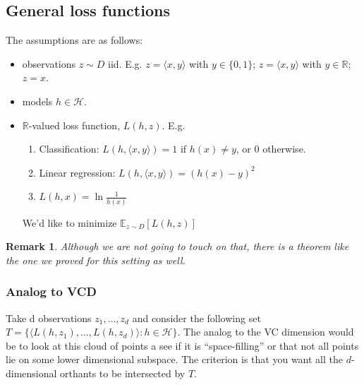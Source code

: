\documentclass[12pt, letterpaper]{article}
\numberwithin{equation}{section} %
\newcommand{\R}{\mathbb{R}}
\newcommand{\mb}{\mathbb}
\newcommand{\mc}{\mathcal}
\newtheorem{remark}[theorem]{Remark}
\theoremstyle{definition}
\theoremstyle{remark}
\begin{document}
\subsection{General loss functions}
The assumptions are as follows:
\begin{itemize}
\item observations $z \sim D$ iid. E.g. $z = \langle x, y\rangle$ with $y\in\lbrace 0,1\rbrace$;  $z = \langle x, y\rangle$ with $y\in\R$; $z=x$.
\item models $h\in\mc H$.
\item $\R$-valued loss function, $L(h,z)$. E.g.
    \begin{enumerate}
    \item Classification: $L(h, \langle x,y \rangle) = 1$ if $h(x)\ne y$, or 0 otherwise.
    \item Linear regression: $L(h, \langle x,y \rangle) = (h(x)-y)^2$
    \item $L(h,x)= \ln \frac1{h(x)}$
    \end{enumerate}
     We'd like to minimize $\mb E_{z\sim D}[L(h,z)]$
\end{itemize}
\begin{remark}
    Although we are not going to touch on that, there is a theorem like the one we proved for this setting as well.
\end{remark}
\subsubsection{Analog to VCD}
Take d observations $z_1,\ldots,z_d$ and consider the following set $T=\lbrace\langle L(h, z_1),\ldots,L(h,z_d)\rangle:h\in\mc H\rbrace$. The analog to the VC dimension would be to look at this cloud of points a see if it is ``space-filling'' or that not all points lie on some lower dimensional subspace. The criterion is that you want all the $d$-dimensional orthants to be intersected by $T$.
\end{document}
